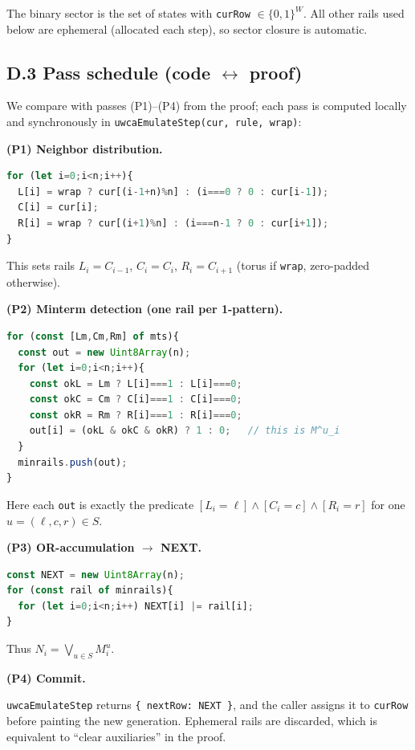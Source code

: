 \documentclass[12pt]{article}
\numberwithin{equation}{section}
\begin{document}
The binary sector is the set of states with \texttt{curRow} $\in \{0,1\}^W$. All other rails used below are ephemeral (allocated each step), so sector closure is automatic.

\subsection*{D.3  Pass schedule (code $\leftrightarrow$ proof)}

We compare with passes (P1)--(P4) from the proof; each pass is computed locally and synchronously in \texttt{uwcaEmulateStep(cur, rule, wrap)}:

\textbf{(P1) Neighbor distribution.}

\begin{lstlisting}[language=JavaScript,basicstyle=\ttfamily\small]
for (let i=0;i<n;i++){
  L[i] = wrap ? cur[(i-1+n)%n] : (i===0 ? 0 : cur[i-1]);
  C[i] = cur[i];
  R[i] = wrap ? cur[(i+1)%n] : (i===n-1 ? 0 : cur[i+1]);
}
\end{lstlisting}

This sets rails $L_i=C_{i-1}$, $C_i=C_i$, $R_i=C_{i+1}$ (torus if \texttt{wrap}, zero-padded otherwise).

\textbf{(P2) Minterm detection (one rail per 1-pattern).}

\begin{lstlisting}[language=JavaScript,basicstyle=\ttfamily\small]
for (const [Lm,Cm,Rm] of mts){
  const out = new Uint8Array(n);
  for (let i=0;i<n;i++){
    const okL = Lm ? L[i]===1 : L[i]===0;
    const okC = Cm ? C[i]===1 : C[i]===0;
    const okR = Rm ? R[i]===1 : R[i]===0;
    out[i] = (okL & okC & okR) ? 1 : 0;   // this is M^u_i
  }
  minrails.push(out);
}
\end{lstlisting}

Here each \texttt{out} is exactly the predicate $[L_i=\ell]\land[C_i=c]\land[R_i=r]$ for one $u=(\ell,c,r)\in S$.

\textbf{(P3) OR-accumulation $\rightarrow$ NEXT.}

\begin{lstlisting}[language=JavaScript,basicstyle=\ttfamily\small]
const NEXT = new Uint8Array(n);
for (const rail of minrails){
  for (let i=0;i<n;i++) NEXT[i] |= rail[i];
}
\end{lstlisting}

Thus $N_i = \bigvee_{u\in S} M^u_i$.

\textbf{(P4) Commit.}

\texttt{uwcaEmulateStep} returns \texttt{\{ nextRow: NEXT \}}, and the caller assigns it to \texttt{curRow} before painting the new generation. Ephemeral rails are discarded, which is equivalent to ``clear auxiliaries'' in the proof.
\end{document}
